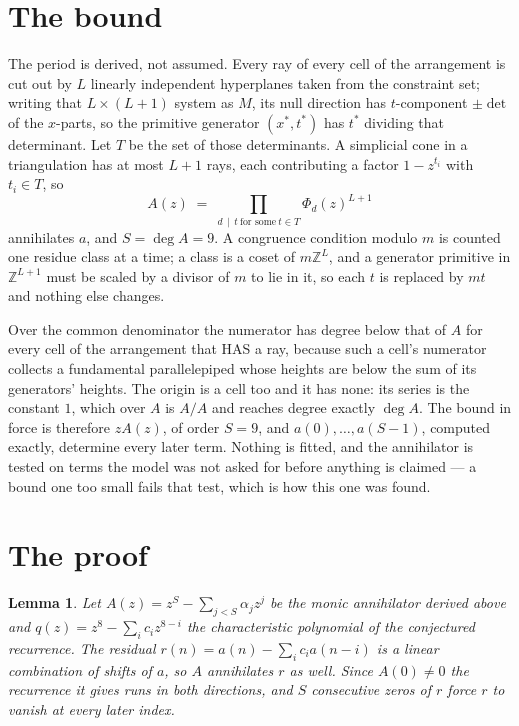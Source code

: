 \documentclass[11pt,a4paper]{article}
\theoremstyle{plain}
\newtheorem{lemma}[theorem]{Lemma}
\theoremstyle{definition}
\begin{document}
\section{The bound}

The period is derived, not assumed. Every ray of every cell of the arrangement is cut out by
$L$ linearly independent hyperplanes taken from the constraint set; writing that $L\times(L+1)$
system as $M$, its null direction has $t$-component $\pm\det$ of the $x$-parts, so the
primitive generator $(x^*,t^*)$ has $t^*$ dividing that determinant. Let $T$ be the set of
those determinants. A simplicial cone in a triangulation has at most $L+1$ rays, each
contributing a factor $1-z^{t_i}$ with $t_i\in T$, so
\[
A(z)\;=\;\prod_{d\,\mid\,t\ \text{for some}\ t\in T}\Phi_d(z)^{L+1}
\]
annihilates $a$, and $S=\deg A=9$. A congruence condition modulo $m$ is counted one residue
class at a time; a class is a coset of $m\mathbb{Z}^L$, and a generator primitive in
$\mathbb{Z}^{L+1}$ must be scaled by a divisor of $m$ to lie in it, so each $t$ is replaced
by $mt$ and nothing else changes.

Over the common denominator the numerator has degree below that of $A$ for every cell of the
arrangement that HAS a ray, because such a cell's numerator collects a fundamental
parallelepiped whose heights are below the sum of its generators' heights. The origin is a cell
too and it has none: its series is the constant $1$, which over $A$ is $A/A$ and reaches degree
exactly $\deg A$. The bound in force is therefore $zA(z)$, of order $S=9$, and
$a(0),\dots,a(S-1)$, computed exactly, determine every later term. Nothing is fitted, and the
annihilator is tested on terms the model was not asked for before anything is claimed --- a
bound one too small fails that test, which is how this one was found.

\section{The proof}

\begin{lemma}\label{lem:crit}
Let $A(z)=z^S-\sum_{j<S}\alpha_jz^{j}$ be the monic annihilator derived above and
$q(z)=z^{8}-\sum_ic_iz^{8-i}$ the characteristic polynomial of the conjectured
recurrence. The residual $r(n)=a(n)-\sum_ic_ia(n-i)$ is a linear combination of shifts of $a$,
so $A$ annihilates $r$ as well. Since $A(0)\ne0$ the recurrence it gives runs in both
directions, and $S$ consecutive zeros of $r$ force $r$ to vanish at every later index.
\end{lemma}
\end{document}
